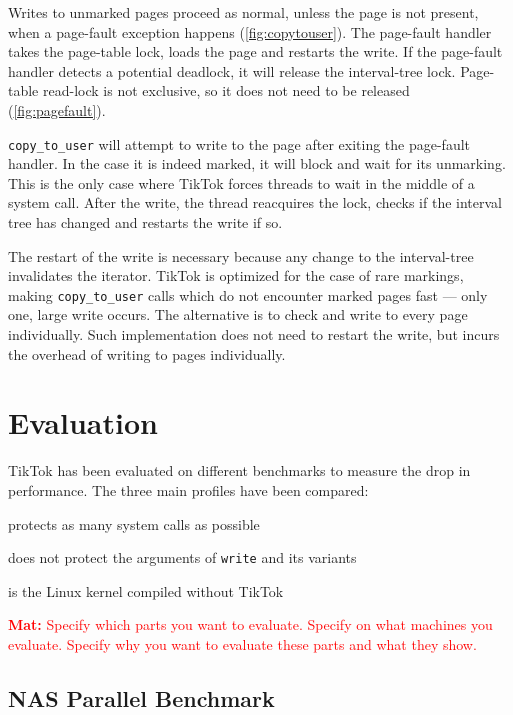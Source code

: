 \documentclass[conference]{IEEEtran}
\newcommand{\mat}[1]{\textcolor{red}{\textbf{Mat:} #1}}
\newcommand{\sysname}{TikTok}
\begin{document}
Writes to unmarked pages proceed as normal, unless the page is not present, when
a page-fault exception happens (\autoref{fig:copytouser}). The page-fault
handler takes the page-table lock, loads the page and restarts the write. If the
page-fault handler detects a potential deadlock, it will release the
interval-tree lock. Page-table read-lock is not exclusive, so it does not need
to be released (\autoref{fig:pagefault}).

\texttt{copy\_to\_user} will attempt to write to the page after exiting the
page-fault handler. In the case it is indeed marked, it will block and wait for
its unmarking. This is the only case where \sysname{} forces threads to wait in
the middle of a system call. After the write, the thread reacquires the lock,
checks if the interval tree has changed and restarts the write if so.

The restart of the write is necessary because any change to the interval-tree
invalidates the iterator. \sysname{} is optimized for the case of rare markings,
making \texttt{copy\_to\_user} calls which do not encounter marked pages fast
--- only one, large write occurs. The alternative is to check and write to every
page individually. Such implementation does not need to restart the write, but
incurs the overhead of writing to pages individually.

\section{Evaluation}
\label{sec:evaluation}

\sysname{} has been evaluated on different benchmarks to measure the drop in performance.
The three main profiles have been compared:
\begin{LaTeXdescription}
  \item[\sysname{} On] protects as many system calls as possible
  \item[\sysname{} Partial] does not protect the arguments of \texttt{write} and its variants
  \item[\sysname{} Off] is the Linux kernel compiled without \sysname{}  
\end{LaTeXdescription}

\mat{Specify which parts you want to evaluate. Specify on what machines you
evaluate. Specify why you want to evaluate these parts and what they show.}

\subsection{NAS Parallel Benchmark}
\label{subsec:npb}
\end{document}
